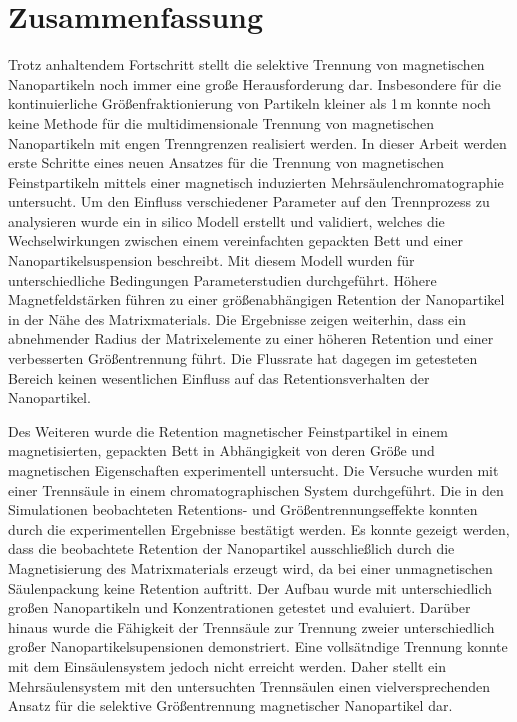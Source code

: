 \chapter{Zusammenfassung}
\label{ch:abstract_de}
Trotz anhaltendem Fortschritt stellt die selektive Trennung von magnetischen Nanopartikeln noch immer eine große Herausforderung dar. Insbesondere für die kontinuierliche Größenfraktionierung von Partikeln kleiner als 1\,\textmu m  konnte noch keine Methode für die multidimensionale Trennung von magnetischen Nanopartikeln mit engen Trenngrenzen realisiert werden. In dieser Arbeit werden erste Schritte eines neuen Ansatzes für die Trennung von magnetischen Feinstpartikeln mittels einer magnetisch induzierten Mehrsäulenchromatographie untersucht. Um den Einfluss verschiedener Parameter auf den Trennprozess zu analysieren wurde ein in silico Modell erstellt und validiert, welches die Wechselwirkungen zwischen einem vereinfachten gepackten Bett und einer Nanopartikelsuspension beschreibt. Mit diesem Modell wurden für unterschiedliche Bedingungen Parameterstudien durchgeführt. Höhere Magnetfeldstärken führen zu einer größenabhängigen Retention der Nanopartikel in der Nähe des Matrixmaterials. Die Ergebnisse zeigen weiterhin, dass ein abnehmender Radius der Matrixelemente zu einer höheren Retention und einer verbesserten Größentrennung führt. Die Flussrate hat dagegen im getesteten Bereich keinen wesentlichen Einfluss auf das Retentionsverhalten der Nanopartikel.

Des Weiteren wurde die Retention magnetischer Feinstpartikel
in einem magnetisierten, gepackten Bett in Abhängigkeit von deren Größe und magnetischen Eigenschaften experimentell untersucht. Die Versuche wurden mit einer Trennsäule in einem chromatographischen System durchgeführt. Die in den Simulationen beobachteten Retentions- und Größentrennungseffekte konnten durch die experimentellen Ergebnisse bestätigt werden. Es konnte gezeigt werden, dass die beobachtete Retention der Nanopartikel ausschließlich durch die Magnetisierung des Matrixmaterials erzeugt wird, da bei einer unmagnetischen Säulenpackung keine Retention auftritt. Der Aufbau wurde mit unterschiedlich großen Nanopartikeln und Konzentrationen getestet und evaluiert. Darüber hinaus wurde die Fähigkeit der Trennsäule zur Trennung zweier unterschiedlich großer Nanopartikelsupensionen demonstriert. Eine vollsätndige Trennung konnte mit dem Einsäulensystem jedoch nicht erreicht werden. Daher stellt ein Mehrsäulensystem mit den untersuchten Trennsäulen einen vielversprechenden Ansatz für die selektive Größentrennung magnetischer Nanopartikel dar.  
